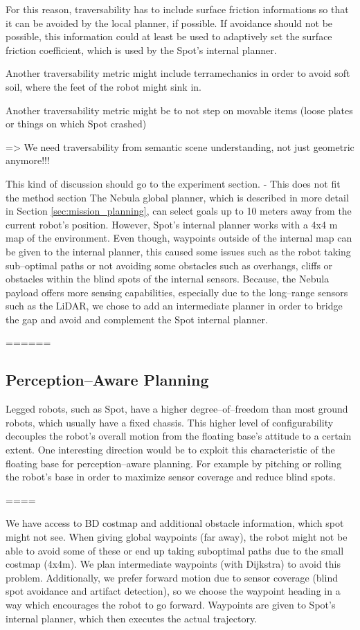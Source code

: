 \documentclass[a4paper, 10pt, conference]{ieeeconf}      %
\newcommand{\inst}[1]{{\color{orange} #1 }} %
\begin{document}
For this reason, traversability has to include surface friction informations so that it can be avoided by the local planner, if possible.
If avoidance should not be possible, this information could at least be used to adaptively set the surface friction coefficient, which is used by the Spot's internal planner.

Another traversability metric might include terramechanics in order to avoid soft soil, where the feet of the robot might sink in.

Another traversability metric might be to not step on movable items (loose plates or things on which Spot crashed)

=> We need traversability from semantic scene understanding, not just geometric anymore!!!

\inst{This kind of discussion should go to the experiment section. - This does not fit the method section} The Nebula global planner, which is described in more detail in Section \ref{sec:mission_planning}, can select goals up to 10 meters away from the current robot's position.
However, Spot's internal planner works with a 4x4 m map of the environment.
Even though, waypoints outside of the internal map can be given to the internal planner, this caused some issues such as the robot taking sub--optimal paths or not avoiding some obstacles such as overhangs, cliffs or obstacles within the blind spots of the internal sensors.
Because, the Nebula payload offers more sensing capabilities, especially due to the long--range sensors such as the LiDAR, we chose to add an intermediate planner in order to bridge the gap and avoid and complement the Spot internal planner.

======

\subsection{Perception--Aware Planning}
Legged robots, such as Spot, have a higher degree--of--freedom than most ground robots, which usually have a fixed chassis.
This higher level of configurability decouples the robot's overall motion from the floating base's attitude to a certain extent.
One interesting direction would be to exploit this characteristic of the floating base for perception--aware planning.
For example by pitching or rolling the robot's base in order to maximize sensor coverage and reduce blind spots.

====

We have access to BD costmap and additional obstacle information, which spot might not see. When giving global waypoints (far away), the robot might not be able to avoid some of these or end up taking suboptimal paths due to the small costmap (4x4m). We plan intermediate waypoints (with Dijkstra) to avoid this problem. Additionally, we prefer forward motion due to sensor coverage (blind spot avoidance and artifact detection), so we choose the waypoint heading in a way which encourages the robot to go forward. Waypoints are given to Spot's internal planner, which then executes the actual trajectory.
\end{document}

